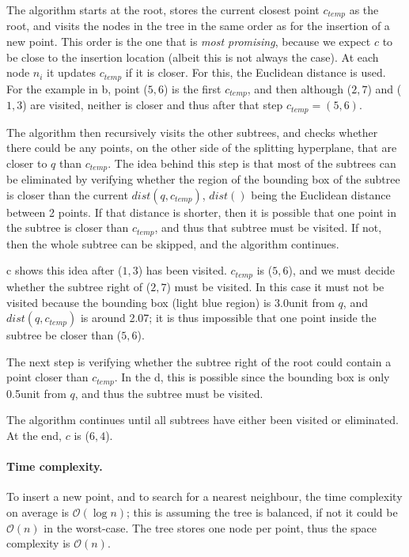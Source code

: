 The algorithm starts at the root, stores the current closest point $c_{temp}$ as the root, and visits the nodes in the tree in the same order as for the insertion of a new point.
This order is the one that is \emph{most promising}, because we expect $c$ to be close to the insertion location (albeit this is not always the case).
At each node $n_i$ it updates $c_{temp}$ if it is closer.
For this, the Euclidean distance is used.
For the example in b, point ($5,6$) is the first $c_{temp}$, and then although ($2,7$) and ($1,3$) are visited, neither is closer and thus after that step $c_{temp} = (5,6)$.

The algorithm then recursively visits the other subtrees, and checks whether there could be any points, on the other side of the splitting hyperplane, that are closer to $q$ than $c_{temp}$.
The idea behind this step is that most of the subtrees can be eliminated by verifying whether the region of the bounding box of the subtree is closer than the current $dist(q, c_{temp})$, $dist()$ being the Euclidean distance between 2 points.
If that distance is shorter, then it is possible that one point in the subtree is closer than $c_{temp}$, and thus that subtree must be visited. 
If not, then the whole subtree can be skipped, and the algorithm continues.

c shows this idea after ($1,3$) has been visited.
$c_{temp}$ is ($5,6$), and we must decide whether the subtree right of ($2,7$) must be visited.
In this case it must not be visited because the bounding box (light blue region) is 3.0unit from $q$, and $dist(q,c_{temp})$ is around 2.07; it is thus impossible that one point inside the subtree be closer than ($5,6$).

The next step is verifying whether the subtree right of the root could contain a point closer than $c_{temp}$.
In the d, this is possible since the bounding box is only 0.5unit from $q$, and thus the subtree must be visited.

The algorithm continues until all subtrees have either been visited or eliminated.
At the end, $c$ is ($6,4$).


\paragraph{Time complexity.}
To insert a new point, and to search for a nearest neighbour, the time complexity on average is $\mathcal{O}(\log n)$; this is assuming the tree is balanced, if not it could be $\mathcal{O}(n)$ in the worst-case.
The tree stores one node per point, thus the space complexity is $\mathcal{O}(n)$.

